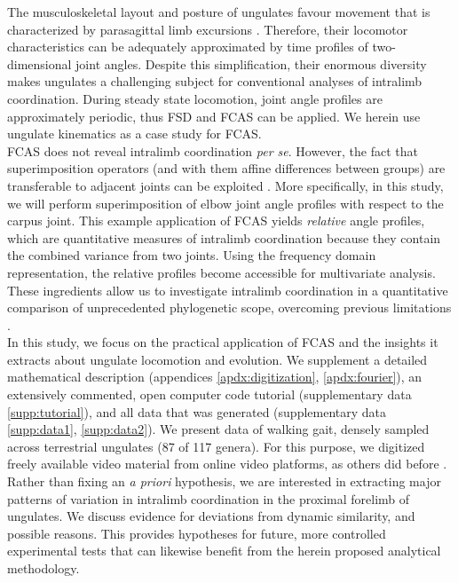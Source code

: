 The musculoskeletal layout and posture of ungulates favour movement that is characterized by parasagittal limb excursions \cite[][]{Jenkins1971,Stein1997}.
Therefore, their locomotor characteristics can be adequately approximated by time profiles of two-dimensional joint angles.
Despite this simplification, their enormous diversity makes ungulates a challenging subject for conventional analyses of intralimb coordination.
During steady state locomotion, joint angle profiles are approximately periodic, thus FSD and FCAS can be applied.
We herein use ungulate kinematics as a case study for FCAS.
\\FCAS does not reveal intralimb coordination \textit{per se}.
However, the fact that superimposition operators (and with them affine differences between groups) are transferable to adjacent joints can be exploited \cite[analogous to][]{Mielke2018}.
More specifically, in this study, we will perform superimposition of elbow joint angle profiles with respect to the carpus joint.
This example application of FCAS yields \textit{relative} angle profiles, which are quantitative measures of intralimb coordination because they contain the combined variance from two joints.
Using the frequency domain representation, the relative profiles become accessible for multivariate analysis.
These ingredients allow us to investigate intralimb coordination in a quantitative comparison of unprecedented phylogenetic scope, overcoming previous limitations \citep{Gatesy2011}.
\\In this study, we focus on the practical application of FCAS and the insights it extracts about ungulate locomotion and evolution.
We supplement a detailed mathematical description (appendices \ref*{apdx:digitization}, \ref*{apdx:fourier}), an extensively commented, open computer code tutorial (supplementary data \ref*{supp:tutorial}), and all data that was generated (supplementary data \ref*{supp:data1}, \ref*{supp:data2}).
We present data of walking gait, densely sampled across terrestrial ungulates (87 of 117 genera).
For this purpose, we digitized freely available video material from online video platforms, as others did before \citep{Biancardi2012,Lees2016}.
Rather than fixing an \textit{a priori} hypothesis, we are interested in extracting major patterns of variation in intralimb coordination in the proximal forelimb of ungulates.
We discuss evidence for deviations from dynamic similarity, and possible reasons.
This provides hypotheses for future, more controlled experimental tests that can likewise benefit from the herein proposed analytical methodology.




